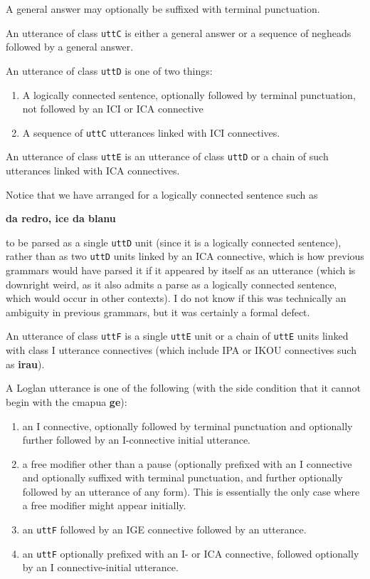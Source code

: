 \documentclass[12pt]{book}
\begin{document}
A general answer may optionally be suffixed with terminal punctuation.

An utterance of class {\tt uttC} is either a general answer or a sequence of negheads followed by a general answer.

An utterance of class {\tt uttD} is one of two things:

\begin{enumerate}

\item  A logically connected sentence, optionally followed by terminal punctuation, not followed by an ICI or ICA connective

\item  A sequence of {\tt uttC} utterances linked with ICI connectives.

\end{enumerate}

An utterance of class {\tt uttE} is an utterance of class {\tt uttD} or a chain of such utterances linked with ICA connectives.

Notice that we have arranged for a logically connected sentence such as

{\bf da redro, ice da blanu}

to be parsed as a single {\tt uttD} unit (since it is a logically connected sentence), rather than as two {\tt uttD} units linked by an ICA connective, which is how previous grammars would have parsed it if it appeared by itself as an utterance (which is downright weird, as it also admits a parse as a logically connected sentence, which would occur in other contexts).  I do not know if this was technically an ambiguity in previous grammars, but it was certainly a formal defect.

An utterance of class {\tt uttF} is a single {\tt uttE} unit or a chain of {\tt uttE} units linked with class I utterance connectives (which include IPA or IKOU connectives such as {\bf irau}).

A Loglan utterance is one of the following (with the side condition that it cannot begin with the cmapua {\bf ge}):

\begin{enumerate}

\item  an I connective, optionally followed by terminal punctuation and optionally further followed by an I-connective initial utterance.

\item  a free modifier other than a pause (optionally prefixed with an I connective and optionally suffixed with terminal punctuation, and further optionally followed by an utterance of any form).   This is essentially the only case where a free modifier might appear initially.

\item  an {\tt uttF} followed by an IGE connective followed by an utterance.

\item  an {\tt uttF} optionally prefixed with an I- or ICA connective, followed optionally by an I connective-initial utterance.

\end{enumerate}
\end{document}
